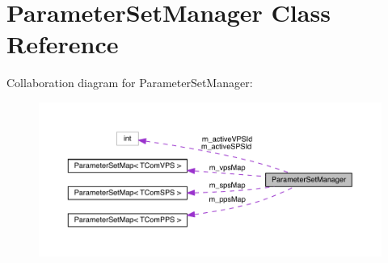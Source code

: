 \hypertarget{class_parameter_set_manager}{}\section{Parameter\+Set\+Manager Class Reference}
\label{class_parameter_set_manager}


Collaboration diagram for Parameter\+Set\+Manager\+:
\nopagebreak
\begin{figure}[H]
\begin{center}
\leavevmode
\includegraphics[width=350pt]{d4/d59/class_parameter_set_manager__coll__graph}
\end{center}
\end{figure}
